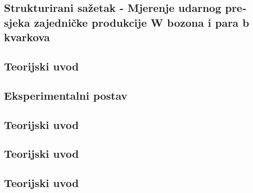 \begin{otherlanguage}{croatian}
\chapter{Strukturirani sažetak - Mjerenje udarnog presjeka zajedničke produkcije W bozona i para b kvarkova} %

\label{Chapter9} %



\section{Teorijski uvod}

\section{Eksperimentalni postav}


\section{Teorijski uvod}

\section{Teorijski uvod}

\section{Teorijski uvod}



\end{otherlanguage}
